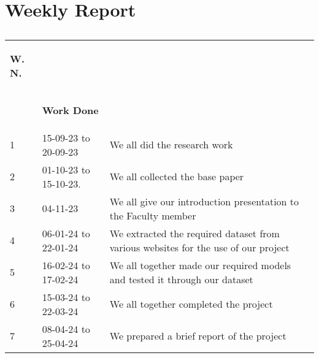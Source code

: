 \chapter{Weekly Report}
\section*{\centering{\huge }}
	\begin{tabular}{|p{1cm}|p{6cm}|p{8cm}|}
			\hline
			\begin{center}
				\textbf{W. N.}
			\end{center} &\begin{center}
				 \textbf{Week Dates}\\ 
			\end{center} & \begin{center}
				\textbf{Work Done}
			\end{center} \\ 
			\hline
			1 & 15-09-23 to 20-09-23
    & We all did the research work \\
    \hline
			2 & 01-10-23 to 15-10-23. &  We all collected the base paper\\
   \hline
			3 & 04-11-23  & We all give our introduction presentation to the Faculty member\\
   \hline
			4 & 06-01-24
to 22-01-24

 & We extracted the required dataset from various websites for the use of our project\\ 
 \hline
			5 & 16-02-24 to 17-02-24
  & We all together made our required models and tested it through our dataset\\
  \hline
			6 & 15-03-24 to 22-03-24
 & We all together completed the project
\\
\hline
			7 & 08-04-24 to 25-04-24 & We prepared a brief report of the project\\  \hline
		\end{tabular}
\\ 